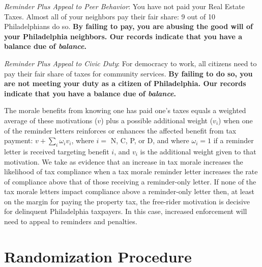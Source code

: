 \documentclass[12pt]{article}
\begin{document}
\bigskip

\noindent \textit{Reminder Plus Appeal to Peer Behavior}: You have not
paid your Real Estate Taxes.  Almost all of your neighbors pay their
fair share: 9 out of 10 Philadelphians do so.  \textbf{By failing to
  pay, you are abusing the good will of your Philadelphia neighbors.
  Our records indicate that you have a balance due of
  \textit{balance}.}

\bigskip

\noindent \textit{Reminder Plus Appeal to Civic Duty}: For democracy
to work, all citizens need to pay their fair share of taxes for
community services.  \textbf{By failing to do so, you are not meeting
  your duty as a citizen of Philadelphia.  Our records indicate that
  you have a balance due of \textit{balance}.}

\bigskip

The morale benefits from knowing one has paid one's taxes equals a
weighted average of these motivations ($v$) plus a possible additional
weight ($v_{i}$) when one of the reminder letters reinforces or
enhances the affected benefit from tax payment: $v + \sum_{i}
\omega_{i} v_{i}$, where $i =$ N, C, P, or D, and where $\omega_{i} =
1$ if a reminder letter is received targeting benefit $i$, and $v_{i}$
is the additional weight given to that motivation. We take as evidence
that an increase in tax morale increases the likelihood of tax
compliance when a tax morale reminder letter increases the rate of
compliance above that of those receiving a reminder-only letter.  If
none of the tax morale letters impact compliance above a reminder-only
letter then, at least on the margin for paying the property tax, the
free-rider motivation is decisive for delinquent Philadelphia
taxpayers.  In this case, increased enforcement will need to appeal to
reminders and penalties.

  
\section{Randomization Procedure}
\end{document}
